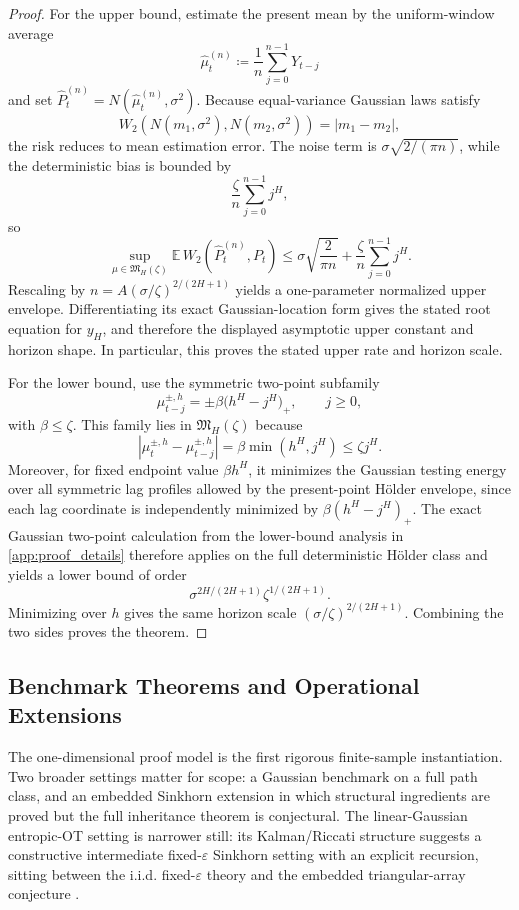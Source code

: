 \begin{proof}
For the upper bound, estimate the present mean by the uniform-window average
\[
  \widehat\mu_t^{(n)}\coloneqq \frac{1}{n}\sum_{j=0}^{n-1}Y_{t-j}
\]
and set $\widehat P_t^{(n)}=N(\widehat\mu_t^{(n)},\sigma^2)$. Because equal-variance
Gaussian laws satisfy
\[
  W_2\!\left(N(m_1,\sigma^2),N(m_2,\sigma^2)\right)=|m_1-m_2|,
\]
the risk reduces to mean estimation error. The noise term is
$\sigma\sqrt{2/(\pi n)}$, while the deterministic bias is bounded by
\[
  \frac{\zeta}{n}\sum_{j=0}^{n-1} j^H,
\]
so
\[
  \sup_{\mu\in\mathfrak M_H(\zeta)}
  \mathbb E\,W_2\!\left(\widehat P_t^{(n)},P_t\right)
  \le
  \sigma\sqrt{\frac{2}{\pi n}} + \frac{\zeta}{n}\sum_{j=0}^{n-1} j^H.
\]
Rescaling by $n=A(\sigma/\zeta)^{2/(2H+1)}$ yields a one-parameter normalized
upper envelope. Differentiating its exact Gaussian-location form gives the stated
root equation for $y_H$, and therefore the displayed asymptotic upper constant
and horizon shape. In particular, this proves the stated upper rate and horizon
scale.

For the lower bound, use the symmetric two-point subfamily
\[
  \mu_{t-j}^{\pm,h}=\pm \beta\bigl(h^H-j^H\bigr)_+,
  \qquad j\ge 0,
\]
with $\beta\le \zeta$. This family lies in $\mathfrak M_H(\zeta)$ because
\[
  |\mu_t^{\pm,h}-\mu_{t-j}^{\pm,h}|=\beta\min(h^H,j^H)\le \zeta j^H.
\]
Moreover, for fixed endpoint value $\beta h^H$, it minimizes the Gaussian testing
energy over all symmetric lag profiles allowed by the present-point H\"older
envelope, since each lag coordinate is independently minimized by
$\beta(h^H-j^H)_+$. The exact Gaussian two-point calculation from the lower-bound
analysis in \cref{app:proof_details} therefore applies on the full deterministic H\"older class and
yields a lower bound of order
\[
  \sigma^{2H/(2H+1)}\zeta^{1/(2H+1)}.
\]
Minimizing over $h$ gives the same horizon scale $(\sigma/\zeta)^{2/(2H+1)}$.
Combining the two sides proves the theorem.
\end{proof}

\subsection{Benchmark Theorems and Operational Extensions}

The one-dimensional proof model is the first rigorous finite-sample
instantiation. Two broader settings matter for scope: a Gaussian benchmark on a
full path class, and an embedded Sinkhorn extension in which structural
ingredients are proved but the full inheritance theorem is conjectural.
The linear-Gaussian entropic-OT setting is narrower still: its Kalman/Riccati
 structure suggests a constructive intermediate fixed-$\varepsilon$ Sinkhorn setting with an
 explicit recursion, sitting between the i.i.d. fixed-$\varepsilon$ theory and
 the embedded triangular-array conjecture \citep{Kalman1960,Jazwinski1970,AkyildizEtAl2024}.


